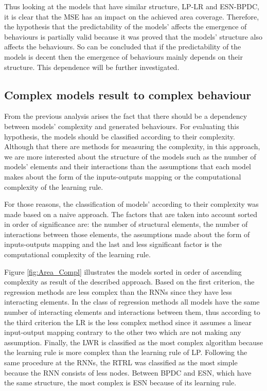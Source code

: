 \documentclass[msc,ai,logo]{infthesis}
\begin{document}
Thus looking at the models that have similar structure, LP-LR and ESN-BPDC, it is clear that the MSE has an impact on the achieved area coverage. Therefore, the hypothesis that the predictability of the models' affects the emergence of behaviours is partially valid because it was proved that the models' structure also affects the behaviours. So can be concluded that if the predictability of the models is decent then the emergence of behaviours mainly depends on their structure. This dependence will be further investigated.  

\subsection*{Complex models result to complex behaviour }

From the previous analysis arises the fact that there should be a dependency between models' complexity and generated behaviours. For evaluating this hypothesis, the models should be classified according to their complexity. Although that there are methods for measuring the complexity, in this approach, we are more interested about the structure of the models such as the number of models' elements and their interactions than the assumptions that each model makes about the form of the inputs-outputs mapping or the computational complexity of the learning rule.

For those reasons, the classification of models' according to their complexity was made based on a naive approach. The factors that are taken into account sorted in order of significance are: the number of structural elements, the number of interactions between those elements, the assumptions made about the form of inputs-outputs mapping and the last and less significant factor is the computational complexity of the learning rule.   

Figure \ref{fig:Area_Compl} illustrates the models sorted in order of ascending complexity as result of the described approach. Based on the first criterion, the regression methods are less complex than the RNNs since they have less interacting elements. In the class of regression methods all models have the same number of interacting elements and interactions between them, thus according to the third criterion the LR is the less complex method since it assumes a linear input-output mapping contrary to the other two which are not making any assumption. Finally, the LWR is classified as the most complex algorithm because the learning rule is more complex than the learning rule of LP.
Following the same procedure at the RNNs, the RTRL was classified as the most simple because the RNN consists of less nodes. Between BPDC and ESN, which have the same structure, the most complex is ESN because of its learning rule.  
 
\end{document}
